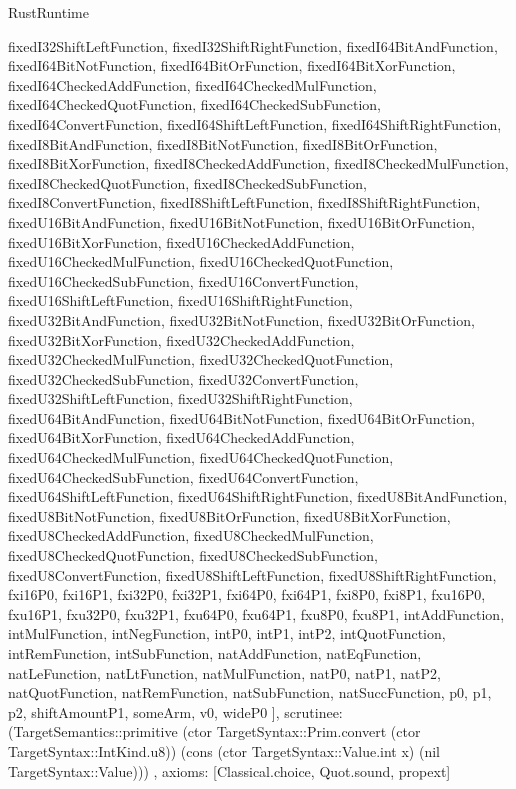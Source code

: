 \begin{lexlean}{RustRuntime}
\begin{semanticmodule}
{{      fixedI32ShiftLeftFunction,
      fixedI32ShiftRightFunction,
      fixedI64BitAndFunction,
      fixedI64BitNotFunction,
      fixedI64BitOrFunction,
      fixedI64BitXorFunction,
      fixedI64CheckedAddFunction,
      fixedI64CheckedMulFunction,
      fixedI64CheckedQuotFunction,
      fixedI64CheckedSubFunction,
      fixedI64ConvertFunction,
      fixedI64ShiftLeftFunction,
      fixedI64ShiftRightFunction,
      fixedI8BitAndFunction,
      fixedI8BitNotFunction,
      fixedI8BitOrFunction,
      fixedI8BitXorFunction,
      fixedI8CheckedAddFunction,
      fixedI8CheckedMulFunction,
      fixedI8CheckedQuotFunction,
      fixedI8CheckedSubFunction,
      fixedI8ConvertFunction,
      fixedI8ShiftLeftFunction,
      fixedI8ShiftRightFunction,
      fixedU16BitAndFunction,
      fixedU16BitNotFunction,
      fixedU16BitOrFunction,
      fixedU16BitXorFunction,
      fixedU16CheckedAddFunction,
      fixedU16CheckedMulFunction,
      fixedU16CheckedQuotFunction,
      fixedU16CheckedSubFunction,
      fixedU16ConvertFunction,
      fixedU16ShiftLeftFunction,
      fixedU16ShiftRightFunction,
      fixedU32BitAndFunction,
      fixedU32BitNotFunction,
      fixedU32BitOrFunction,
      fixedU32BitXorFunction,
      fixedU32CheckedAddFunction,
      fixedU32CheckedMulFunction,
      fixedU32CheckedQuotFunction,
      fixedU32CheckedSubFunction,
      fixedU32ConvertFunction,
      fixedU32ShiftLeftFunction,
      fixedU32ShiftRightFunction,
      fixedU64BitAndFunction,
      fixedU64BitNotFunction,
      fixedU64BitOrFunction,
      fixedU64BitXorFunction,
      fixedU64CheckedAddFunction,
      fixedU64CheckedMulFunction,
      fixedU64CheckedQuotFunction,
      fixedU64CheckedSubFunction,
      fixedU64ConvertFunction,
      fixedU64ShiftLeftFunction,
      fixedU64ShiftRightFunction,
      fixedU8BitAndFunction,
      fixedU8BitNotFunction,
      fixedU8BitOrFunction,
      fixedU8BitXorFunction,
      fixedU8CheckedAddFunction,
      fixedU8CheckedMulFunction,
      fixedU8CheckedQuotFunction,
      fixedU8CheckedSubFunction,
      fixedU8ConvertFunction,
      fixedU8ShiftLeftFunction,
      fixedU8ShiftRightFunction,
      fxi16P0,
      fxi16P1,
      fxi32P0,
      fxi32P1,
      fxi64P0,
      fxi64P1,
      fxi8P0,
      fxi8P1,
      fxu16P0,
      fxu16P1,
      fxu32P0,
      fxu32P1,
      fxu64P0,
      fxu64P1,
      fxu8P0,
      fxu8P1,
      intAddFunction,
      intMulFunction,
      intNegFunction,
      intP0,
      intP1,
      intP2,
      intQuotFunction,
      intRemFunction,
      intSubFunction,
      natAddFunction,
      natEqFunction,
      natLeFunction,
      natLtFunction,
      natMulFunction,
      natP0,
      natP1,
      natP2,
      natQuotFunction,
      natRemFunction,
      natSubFunction,
      natSuccFunction,
      p0,
      p1,
      p2,
      shiftAmountP1,
      someArm,
      v0,
      wideP0
    ],
    scrutinee: (TargetSemantics::primitive (ctor TargetSyntax::Prim.convert (ctor TargetSyntax::IntKind.u8)) (cons (ctor TargetSyntax::Value.int x) (nil TargetSyntax::Value)))
  },
  axioms: [Classical.choice, Quot.sound, propext]
}


\end{semanticmodule}
\end{lexlean}

